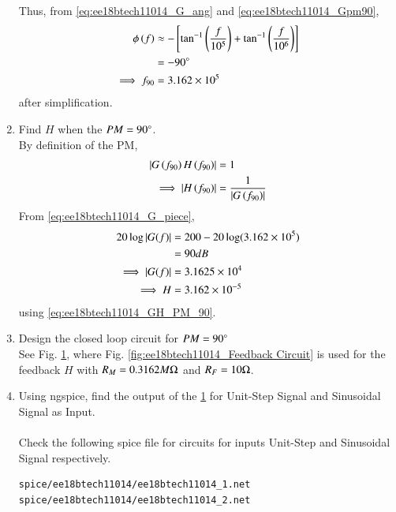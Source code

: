 \begin{enumerate}[label=\thesection.\arabic*.,ref=\thesection.\theenumi]
Thus, from  \eqref{eq:ee18btech11014_G_ang} and \eqref{eq:ee18btech11014_Gpm90},
%
\begin{align}
\phi\left(f\right) &\approx
-{}\left[\tan ^{-1}\left(\frac{f}{10^{5}}\right)+\tan ^{-1}\left(\frac{f}{10^{6}}\right)\right]
\\
&= -90 \degree
\\
\implies f_{90} &= 3.162 \times 10^{5}
\end{align}
after simplification.
\item Find $H$ when the $PM = 90 \degree$.
\\
\solution By definition of the PM, 
\begin{align}
\left\vert G\left(f_{90}\right)H\left(f_{90}\right)\right\vert &=1
\\
\implies \left\vert H\left(f_{90}\right)\right\vert &=\frac{1}{\left\vert G\left(f_{90}\right)\right\vert}
\label{eq:ee18btech11014_GH_PM_90}
\end{align}
%
From \eqref{eq:ee18btech11014_G_piece},
\begin{align}
20 \log \left\vert G(f)\right\vert &= 200 - 20\log(3.162 \times 10^{5})\\
&= 90 dB \\
\implies \left\vert G(f)\right\vert &= 3.1625 \times 10^{4}
\\
\implies H &= 3.162 \times 10^{-5}
\end{align}
using \eqref{eq:ee18btech11014_GH_PM_90}.
\item Design the closed loop circuit for $PM = 90 \degree$
\\
\solution See Fig. 	\ref{fig:ee18btech11014_Closed-Loop Circuit alpha=90}, where Fig. 	\ref{fig:ee18btech11014_Feedback Circuit} is used for the feedback $H$ with $R_M = 0.3162 M \ohm$ and 	$R_F = 10 \ohm$.

\begin{figure}[ht!]
	\begin{center}
		\resizebox{\columnwidth}{!}{}
	\end{center}
	\caption{}
	\label{fig:ee18btech11014_Closed-Loop Circuit alpha=90}
\end{figure}

\item Using ngspice, find the output of the \ref{fig:ee18btech11014_Closed-Loop Circuit alpha=90} for Unit-Step Signal and Sinusoidal Signal as Input.\\
\solution\\
Check the following spice file for circuits for inputs Unit-Step and Sinusoidal Signal respectively.
\begin{lstlisting}
spice/ee18btech11014/ee18btech11014_1.net
spice/ee18btech11014/ee18btech11014_2.net
\end{lstlisting}


\end{enumerate}
